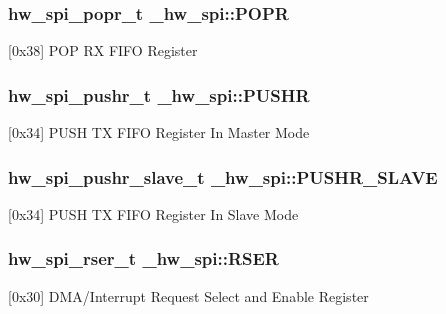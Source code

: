 \subsubsection[{\texorpdfstring{P\+O\+PR}{POPR}}]{ {\bf hw\+\_\+spi\+\_\+popr\+\_\+t} \+\_\+hw\+\_\+spi\+::\+P\+O\+PR}\hypertarget{struct__hw__spi_ab2654980b102d4bd1cf1629ea0597151}{}\label{struct__hw__spi_ab2654980b102d4bd1cf1629ea0597151}
\mbox{[}0x38\mbox{]} P\+OP RX F\+I\+FO Register 
\subsubsection[{\texorpdfstring{P\+U\+S\+HR}{PUSHR}}]{ {\bf hw\+\_\+spi\+\_\+pushr\+\_\+t} \+\_\+hw\+\_\+spi\+::\+P\+U\+S\+HR}\hypertarget{struct__hw__spi_adc3821caf17c9b258b57e1e8172a0698}{}\label{struct__hw__spi_adc3821caf17c9b258b57e1e8172a0698}
\mbox{[}0x34\mbox{]} P\+U\+SH TX F\+I\+FO Register In Master Mode 
\subsubsection[{\texorpdfstring{P\+U\+S\+H\+R\+\_\+\+S\+L\+A\+VE}{PUSHR_SLAVE}}]{ {\bf hw\+\_\+spi\+\_\+pushr\+\_\+slave\+\_\+t} \+\_\+hw\+\_\+spi\+::\+P\+U\+S\+H\+R\+\_\+\+S\+L\+A\+VE}\hypertarget{struct__hw__spi_a86954e86244f3aece26c43efea1bf141}{}\label{struct__hw__spi_a86954e86244f3aece26c43efea1bf141}
\mbox{[}0x34\mbox{]} P\+U\+SH TX F\+I\+FO Register In Slave Mode 
\subsubsection[{\texorpdfstring{R\+S\+ER}{RSER}}]{ {\bf hw\+\_\+spi\+\_\+rser\+\_\+t} \+\_\+hw\+\_\+spi\+::\+R\+S\+ER}\hypertarget{struct__hw__spi_adc7782f9d71a5e41a6628aac90593698}{}\label{struct__hw__spi_adc7782f9d71a5e41a6628aac90593698}
\mbox{[}0x30\mbox{]} D\+M\+A/\+Interrupt Request Select and Enable Register 
